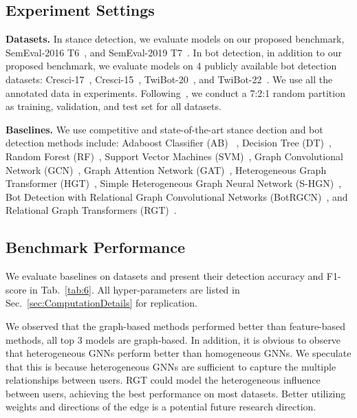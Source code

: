 \documentclass[10pt,twocolumn,letterpaper]{article}
\begin{document}
\subsection{Experiment Settings}

\noindent
\textbf{Datasets.}
In stance detection, we evaluate models on our proposed benchmark, SemEval-2016 T6~\cite{Alpher21}, and SemEval-2019 T7~\cite{Alpher25}. In bot detection, in addition to our proposed benchmark, we evaluate models on 4 publicly available bot detection datasets: Cresci-17~\cite{Alpher04}, Cresci-15~\cite{Alpher10}, TwiBot-20~\cite{Alpher11}, and TwiBot-22~\cite{Alpher12}. We use all the annotated data in experiments. Following~\cite{Alpher11,Alpher12}, we conduct a 7:2:1 random partition as training, validation, and test set for all datasets.

\noindent
\textbf{Baselines.}
We use competitive and state-of-the-art stance dection and bot detection methods include: Adaboost Classifier (AB) ~\cite{Alpher57}, Decision Tree (DT)~\cite{Alpher60}, Random Forest (RF)~\cite{Alpher59}, Support Vector Machines (SVM)~\cite{Alpher61}, Graph Convolutional Network (GCN)~\cite{Alpher42}, Graph Attention Network (GAT)~\cite{Alpher20}, Heterogeneous Graph Transformer (HGT)~\cite{Alpher55}, Simple Heterogeneous Graph Neural Network (S-HGN)~\cite{Alpher56}, Bot Detection with Relational Graph Convolutional Networks (BotRGCN)~\cite{Alpher06}, and Relational Graph Transformers (RGT)~\cite{Alpher44}.


\subsection{Benchmark Performance}
\label{sec:benchmarkPerformance}
We evaluate baselines on datasets and present their detection accuracy and F1-score in Tab.~\ref{tab:6}. All hyper-parameters are listed in Sec.~\ref{sec:ComputationDetails} for replication.

We observed that the graph-based methods performed better than feature-based methods, all top 3 models are graph-based. In addition, it is obvious to observe that heterogeneous GNNs perform better than homogeneous GNNs. We speculate that this is because heterogeneous GNNs are sufficient to capture the multiple relationships between users.
RGT could model the heterogeneous influence between users, achieving the best performance on most datasets. Better utilizing weights and directions of the edge is a potential future research direction.
\end{document}
